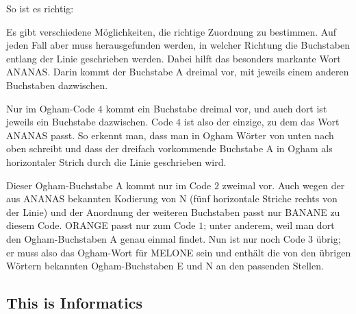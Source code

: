 \documentclass[a4paper,11pt]{report}
\newcommand{\taskGraphicsFolder}{..}
\begin{document}
So ist es richtig:

{\centering%
\par}

Es gibt verschiedene Möglichkeiten, die richtige Zuordnung zu bestimmen. Auf jeden Fall aber muss herausgefunden werden, in welcher Richtung die Buchstaben entlang der Linie geschrieben werden. Dabei hilft das besonders markante Wort ANANAS. Darin kommt der Buchstabe A dreimal vor, mit jeweils einem anderen Buchstaben dazwischen.

Nur im Ogham-Code $4$ kommt ein Buchstabe dreimal vor, und auch dort ist jeweils ein Buchstabe dazwischen. Code $4$ ist also der einzige, zu dem das Wort ANANAS passt. So erkennt man, dass man in Ogham Wörter von unten nach oben schreibt und dass der dreifach vorkommende Buchstabe A in Ogham als horizontaler Strich durch die Linie geschrieben wird.

Dieser Ogham-Buchstabe A kommt nur im Code $2$ zweimal vor.  Auch wegen der aus ANANAS bekannten Kodierung von N (fünf horizontale Striche rechts von der Linie) und der Anordnung der weiteren Buchstaben passt nur BANANE zu diesem Code. ORANGE passt nur zum Code $1$; unter anderem, weil man dort den Ogham-Buchstaben A genau einmal findet.  Nun ist nur noch Code $3$ übrig; er muss also das Ogham-Wort für MELONE sein und enthält die von den übrigen Wörtern bekannten Ogham-Buchstaben E und N an den passenden Stellen.


\subsection*{This is Informatics}
\end{document}

